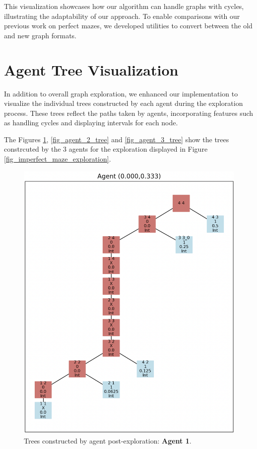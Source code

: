 This visualization showcases how our algorithm can handle graphs
with cycles, illustrating the adaptability of our approach.
To enable comparisons with our previous work on perfect mazes,
we developed utilities to convert between the old and new graph formats.

\section{Agent Tree Visualization}
\label{section_result_tree_visualization}

In addition to overall graph exploration,
we enhanced our implementation to visualize the individual trees constructed by each agent during the exploration process.
These trees reflect the paths taken by agents, incorporating features such as handling
cycles and displaying intervals for each node.

The Figures \ref{fig_agent_1_tree}, \ref{fig_agent_2_tree} and \ref{fig_agent_3_tree}
show the trees constrcuted by the 3 agents for the exploration displayed in Figure \ref{fig_imperfect_maze_exploration}.
    
\begin{figure}[H]
\centering
\includegraphics[width=1\textwidth]{Cap3/agent_1.png}
\caption{Trees constructed by agent post-exploration: \textbf{Agent 1}.}
\label{fig_agent_1_tree}
\end{figure}

